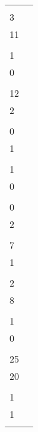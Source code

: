 \begin{minipage}{0.48\textwidth}
\begin{tabular}{ll}
{\begin{matrix}2 \\ 3 \\ 11 \\ \end{matrix}\,\, 
\begin{matrix}1 \\ 1 \\ 0 \\ \end{matrix}\,\, 
\begin{matrix}1 \\ 12 \\ 2 \\ \end{matrix}\,\, 
\begin{matrix}2 \\ 0 \\ 1 \\ \end{matrix}\,\, 
\begin{matrix}1 \\ 1 \\ 0 \\ \end{matrix}\,\, 
\begin{matrix}2 \\ 0 \\ 2 \\ \end{matrix}\,\, 
\begin{matrix}1 \\ 7 \\ 1 \\ \end{matrix}\,\, 
}\right]$ \\
$\sqrt[3]{26}$ & $\left[
\begin{matrix} \\ 2 \\ 8 \\ \end{matrix}\,\, 
\begin{matrix}1 \\ 1 \\ 0 \\ \end{matrix}\,\, 
\begin{matrix}1 \\ 25 \\ 20 \\ \end{matrix}\,\, 
\overline{
\begin{matrix}1 \\ 1 \\ 1 \\ \end{matrix}\,\, 
}
\end{tabular}
\end{minipage}
